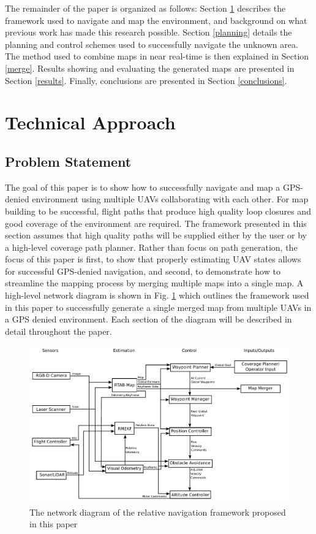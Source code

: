 \documentclass[letterpaper, 10 pt, conference]{ieeeconf}  %
\begin{document}
The remainder of the paper is organized as follows: Section \ref{approach} describes the framework used to navigate and map the environment, and background on what previous work has made this research possible. Section \ref{planning} details the planning and control schemes used to successfully navigate the unknown area. The method used to combine maps in near real-time is then explained in Section \ref{merge}. Results showing and evaluating the generated maps are presented in Section \ref{results}. Finally, conclusions are presented in Section \ref{conclusions}.

\section{Technical Approach}\label{approach}

\subsection{Problem Statement}

The goal of this paper is to show how to successfully navigate and map a GPS-denied environment using multiple UAVs collaborating with each other. For map building to be successful, flight paths that produce high quality loop closures and good coverage of the environment are required. The framework presented in this section assumes that high quality paths will be supplied either by the user or by a high-level coverage path planner. Rather than focus on path generation, the focus of this paper is first, to show that properly estimating UAV states allows for successful GPS-denied navigation, and second, to demonstrate how to streamline the mapping process by merging multiple maps into a single map. A high-level network diagram is shown in Fig. \ref{fig:rtab_network} which outlines the framework used in this paper to successfully generate a single merged map from multiple UAVs in a GPS denied environment. Each section of the diagram will be described in detail throughout the paper.

\begin{figure}
\centering
\includegraphics[width=1.0\linewidth]{rtab_relative_nav_network}
\caption{The network diagram of the relative navigation framework proposed in this paper}
\label{fig:rtab_network}
\end{figure}
\end{document}
